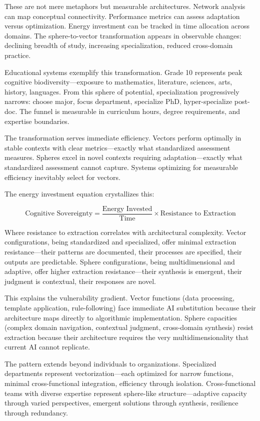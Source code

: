 These are not mere metaphors but measurable architectures. Network analysis can map conceptual connectivity. Performance metrics can assess adaptation versus optimization. Energy investment can be tracked in time allocation across domains. The sphere-to-vector transformation appears in observable changes: declining breadth of study, increasing specialization, reduced cross-domain practice.

Educational systems exemplify this transformation. Grade 10 represents peak cognitive biodiversity---exposure to mathematics, literature, sciences, arts, history, languages. From this sphere of potential, specialization progressively narrows: choose major, focus department, specialize PhD, hyper-specialize post-doc. The funnel is measurable in curriculum hours, degree requirements, and expertise boundaries.

The transformation serves immediate efficiency. Vectors perform optimally in stable contexts with clear metrics---exactly what standardized assessment measures. Spheres excel in novel contexts requiring adaptation---exactly what standardized assessment cannot capture. Systems optimizing for measurable efficiency inevitably select for vectors.

The energy investment equation crystallizes this:

\begin{equation}
\text{Cognitive Sovereignty} = \frac{\text{Energy Invested}}{\text{Time}} \times \text{Resistance to Extraction}
\end{equation}

Where resistance to extraction correlates with architectural complexity. Vector configurations, being standardized and specialized, offer minimal extraction resistance---their patterns are documented, their processes are specified, their outputs are predictable. Sphere configurations, being multidimensional and adaptive, offer higher extraction resistance---their synthesis is emergent, their judgment is contextual, their responses are novel.

This explains the vulnerability gradient. Vector functions (data processing, template application, rule-following) face immediate AI substitution because their architecture maps directly to algorithmic implementation. Sphere capacities (complex domain navigation, contextual judgment, cross-domain synthesis) resist extraction because their architecture requires the very multidimensionality that current AI cannot replicate.

The pattern extends beyond individuals to organizations. Specialized departments represent vectorization---each optimized for narrow functions, minimal cross-functional integration, efficiency through isolation. Cross-functional teams with diverse expertise represent sphere-like structure---adaptive capacity through varied perspectives, emergent solutions through synthesis, resilience through redundancy.

